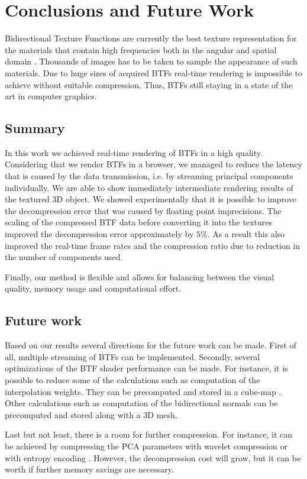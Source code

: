\chapter{Conclusions and Future Work}
\label{chapter:conclusions}
 Bidirectional Texture Functions are currently the best texture representation for the materials 
 that contain high frequencies both in the angular and spatial domain \cite{mueller-2003-compression}.
 Thousands of images has to be taken to sample the appearance of such materials.
 Due to huge sizes of acquired BTFs real-time rendering is impossible to achieve without suitable compression.
 Thus, BTFs still staying in a state of the art in computer graphics. 

\section{Summary}

 In this work we achieved real-time rendering of BTFs in a high quality.
 Considering that we render BTFs in a browser, we managed to reduce the latency that is caused by the data transmission, i.e.
 by streaming  principal components individually.
 We are able to show immediately intermediate rendering results of the textured 3D object.
 We showed experimentally that it is possible to improve the decompression error that was caused by floating point imprecisions.
 The scaling of the compressed BTF data before converting it into the textures improved the decompression error approximately by $5\%$.
 As a result this also improved the real-time frame rates and the compression ratio due to reduction in the number of components used.


Finally, our method is flexible and allows for balancing between the visual quality, memory usage and computational effort.
\section{Future work}
\label{section:future_work}

Based on our results several directions for the future work can be made.
First of all, multiple streaming of BTFs can be implemented.
Secondly, several optimizations of the BTF shader performance can be made.
For instance, it is possible to reduce some of the calculations such as computation of the interpolation weights. 
They can be precomputed and stored in a cube-map \cite{haindl}.
Other calculations such as computation of the bidirectional normals can be precomputed and stored along with a 3D mesh.

Last but not least, there is a room for further compression.
 For instance, it can be achieved by compressing the PCA parameters with wavelet compression \cite{webglbtfstreaming} or with entropy encoding \cite{gpu_gems}. 
However, the decompression cost will grow, but it can be worth if further memory savings are necessary. 